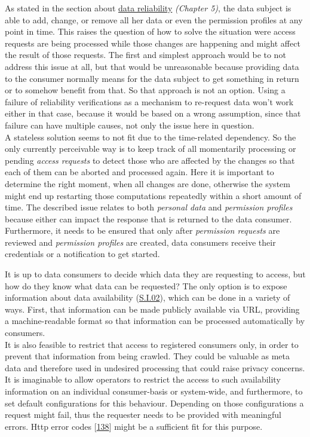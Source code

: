 \documentclass[12pt,english,a4paper,titlepage,cleardoublepage=empty,dottedtoc]{report}
\begin{document}
As stated in the section about \protect\hyperlink{data-reliability}{data
reliability} \emph{(Chapter 5)}, the data subject is able to add,
change, or remove all her data or even the permission profiles at any
point in time. This raises the question of how to solve the situation
were access requests are being processed while those changes are
happening and might affect the result of those requests. The first and
simplest approach would be to not address this issue at all, but that
would be unreasonable because providing data to the consumer normally
means for the data subject to get something in return or to somehow
benefit from that. So that approach is not an option. Using a failure of
reliability verifications as a mechanism to re-request data won't work
either in that case, because it would be based on a wrong assumption,
since that failure can have multiple causes, not only the issue here in
question.\\
A stateless solution seems to not fit due to the time-related
dependency. So the only currently perceivable way is to keep track of
all momentarily processing or pending \emph{access requests} to detect
those who are affected by the changes so that each of them can be
aborted and processed again. Here it is important to determine the right
moment, when all changes are done, otherwise the system might end up
restarting those computations repeatedly within a short amount of time.
The described issue relates to both \emph{personal data} and
\emph{permission profiles} because either can impact the response that
is returned to the data consumer. Furthermore, it needs to be ensured
that only after \emph{permission requests} are reviewed and
\emph{permission profiles} are created, data consumers receive their
credentials or a notification to get started.

It is up to data consumers to decide which data they are requesting to
access, but how do they know what data can be requested? The only option
is to expose information about data availability
(\protect\hyperlink{si02}{S.I.02}), which can be done in a variety of
ways. First, that information can be made publicly available via URL,
providing a machine-readable format so that information can be processed
automatically by consumers.\\
It is also feasible to restrict that access to registered consumers
only, in order to prevent that information from being crawled. They
could be valuable as meta data and therefore used in undesired
processing that could raise privacy concerns. It is imaginable to allow
operators to restrict the access to such availability information on an
individual consumer-basis or system-wide, and furthermore, to set
default configurations for this behaviour. Depending on those
configurations a request might fail, thus the requester needs to be
provided with meaningful errors. Http error codes
{[}\protect\hyperlink{ref-web_spec_http-error-codes}{138}{]} might be a
sufficient fit for this purpose.
\end{document}
